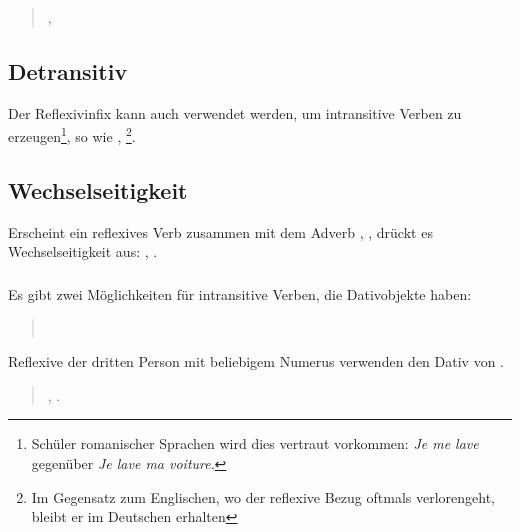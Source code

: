 \begin{quotation}
\noindent{}, 
\end{quotation} 
\noindent {}

\subsection{Detransitiv} Der Reflexivinfix kann auch verwendet werden, um intransitive
Verben zu erzeugen\footnote{Sch\"uler romanischer Sprachen wird dies vertraut vorkommen:
\textit{Je me lave} gegen\"uber \textit{Je lave ma voiture}.}, so wie ,
\footnote{Im Gegensatz zum Englischen, wo der reflexive Bezug oftmals
verlorengeht, bleibt er im Deutschen erhalten}.

\subsection{Wechselseitigkeit} Erscheint ein reflexives Verb zusammen mit dem Adverb
, , dr\"uckt es Wechselseitigkeit aus: , .

\subsubsection{} Es gibt zwei M\"oglichkeiten f\"ur intransitive Verben, die
Dativobjekte haben:

\begin{quotation}
\noindent{}  \\
\noindent{} 
\end{quotation}

\noindent Reflexive der dritten Person mit beliebigem Numerus verwenden den Dativ
von .

\begin{quotation}
\noindent{}, .
\end{quotation}

\noindent{}


